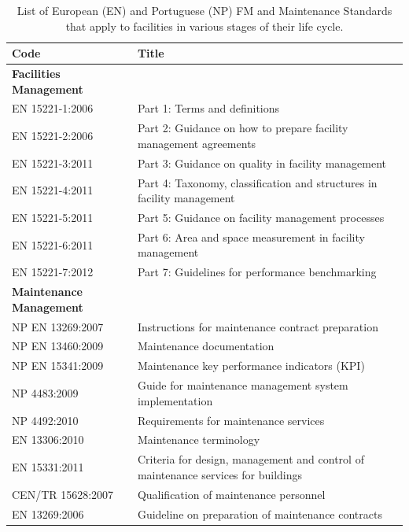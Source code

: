\begin{table}[h!]
		\centering
		\vspace{0cm}
		\begin{adjustwidth}{0cm}{0cm}%
			\begin{tabularx}{\textwidth}{l X}
				\hline
				\multicolumn{1}{l}{\bf Code} & \multicolumn{1}{l}{ \bf Title} \\ 
				\hline

				{\bf Facilities Management} & \\
				EN 15221-1:2006 & Part 1: Terms and definitions \\
				EN 15221-2:2006  & Part 2: Guidance on how to prepare facility management agreements \\
				EN 15221-3:2011  & Part 3: Guidance on quality in facility management \\
				EN 15221-4:2011  & Part 4: Taxonomy, classification and structures in facility management \\
				EN 15221-5:2011  &  Part 5: Guidance on facility management processes \\
				EN 15221-6:2011  &  Part 6: Area and space measurement in facility management \\
				EN 15221-7:2012  &  Part 7: Guidelines for performance benchmarking\\
				\hline

				{\bf Maintenance Management} &  \\
				NP EN 13269:2007  & Instructions for maintenance contract preparation \\
				 NP EN 13460:2009 & Maintenance documentation \\
				NP EN 15341:2009  &  Maintenance key performance indicators (KPI) \\ 
				NP 4483:2009  & Guide for maintenance management system implementation \\ 
				 NP 4492:2010 & Requirements for maintenance services \\ 
				 EN 13306:2010  & Maintenance terminology \\ 
				 EN 15331:2011 & Criteria for design, management and control of maintenance services for buildings \\ 
				CEN/TR 15628:2007 & Qualification of maintenance personnel \\ 
				EN 13269:2006  & Guideline on preparation of maintenance contracts \\ 
				\hline

			\end{tabularx}
		\caption{List of European (EN) and Portuguese (NP) FM and Maintenance Standards that apply to facilities in various stages of their life cycle. }
		\label{tb:TableNPEN}
		\end{adjustwidth}
\end{table}

